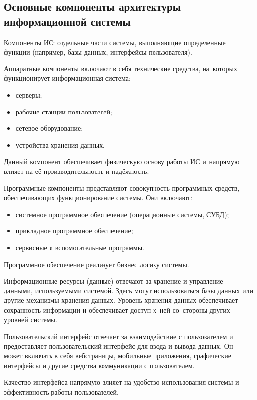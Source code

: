 \documentclass{ou}
\begin{document}
\subsection{Основные компоненты архитектуры информационной системы}
Компоненты ИС: отдельные части системы, выполняющие определенные функции (например, базы данных, интерфейсы пользователя)\cite{academia2023}.

Аппаратные компоненты включают в себя технические средства, на~которых функционирует информационная система:
\begin{itemize}[label=-, leftmargin=0em, itemindent=3.35em, nosep]
\item серверы;
\item рабочие станции пользователей;
\item сетевое оборудование;
\item устройства хранения данных.
\end{itemize}

Данный компонент обеспечивает физическую основу работы ИС и~напрямую влияет на её производительность и надёжность.

Программные компоненты представляют совокупность программных средств, обеспечивающих функционирование системы. Они включают:
\begin{itemize}[label=-, leftmargin=0em, itemindent=3.35em, nosep]
\item системное программное обеспечение (операционные системы, СУБД);
\item прикладное программное обеспечение;
\item сервисные и вспомогательные программы.
\end{itemize}

Программное обеспечение реализует бизнес логику системы.

Информационные ресурсы (данные) отвечают за хранение и управление данными, используемыми системой. Здесь могут использоваться базы данных или другие механизмы хранения данных. Уровень хранения данных обеспечивает сохранность информации и обеспечивает доступ к~ней со~стороны других уровней системы\cite{ifmo2024}.

Пользовательский интерфейс отвечает за взаимодействие с пользователем и предоставляет пользовательский интерфейс для ввода и вывода данных. Он может включать в себя вебстраницы, мобильные приложения, графические интерфейсы и другие средства коммуникации с пользователем.

Качество интерфейса напрямую влияет на удобство использования системы и эффективность работы пользователей\cite{ifmo2024}.
\end{document}
